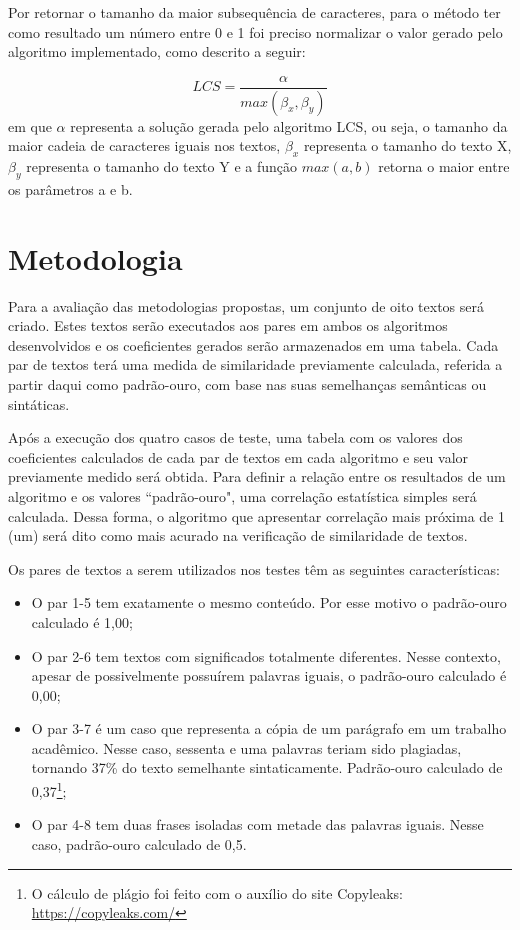 \documentclass[12pt]{article}
\begin{document}
Por retornar o tamanho da maior subsequência de caracteres, para o método ter como resultado um número entre 0 e 1 foi preciso normalizar o valor gerado pelo algoritmo implementado, como descrito a seguir:

\begin{equation}
    LCS={\frac{\alpha}{max(\beta_x , \beta_y)}}
\end{equation}
em que $\alpha$ representa a solução gerada pelo algoritmo LCS, ou seja, o tamanho da maior cadeia de caracteres iguais nos textos, $\beta_x$ representa o tamanho do texto X, $\beta_y$ representa o tamanho do texto Y e a função $max(a, b)$ retorna o maior entre os parâmetros a e b.

\section{Metodologia} \label{sec:metodologia}
Para a avaliação das metodologias propostas, um conjunto de oito textos será criado. Estes textos serão executados aos pares em ambos os algoritmos desenvolvidos e os coeficientes gerados serão armazenados em uma tabela. Cada par de textos terá uma medida de similaridade previamente calculada, referida a partir daqui como padrão-ouro, com base nas suas semelhanças semânticas ou sintáticas.

Após a execução dos quatro casos de teste, uma tabela com os valores dos coeficientes calculados de cada par de textos em cada algoritmo e seu valor previamente medido será obtida. Para definir a relação entre os resultados de um algoritmo e os valores ``padrão-ouro", uma correlação estatística simples será calculada. Dessa forma, o algoritmo que apresentar correlação mais próxima de 1 (um) será dito como mais acurado na verificação de similaridade de textos.

Os pares de textos a serem utilizados nos testes têm as seguintes características:

\begin{itemize}
    \item O par 1-5 tem exatamente o mesmo conteúdo. Por esse motivo o padrão-ouro calculado é 1,00;
    \item O par 2-6 tem textos com significados totalmente diferentes. Nesse contexto, apesar de possivelmente possuírem palavras iguais, o padrão-ouro calculado é 0,00;
    \item O par 3-7 é um caso que representa a cópia de um parágrafo em um trabalho acadêmico. Nesse caso, sessenta e uma palavras teriam sido plagiadas, tornando 37\% do texto semelhante sintaticamente. Padrão-ouro calculado de 0,37\footnote{O cálculo de plágio foi feito com o auxílio do site Copyleaks: \url{https://copyleaks.com/}};
    \item O par 4-8 tem duas frases isoladas com metade das palavras iguais. Nesse caso, padrão-ouro calculado de 0,5.
\end{itemize}
\end{document}
